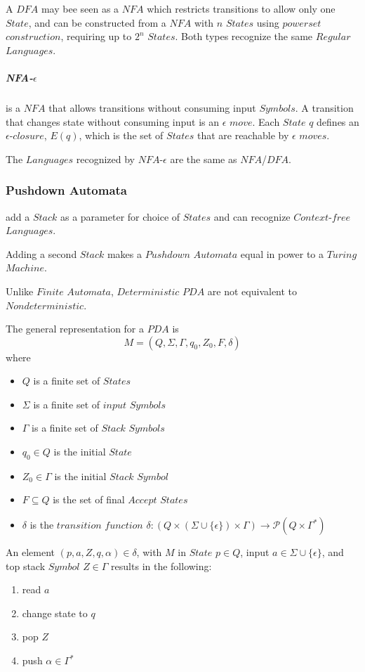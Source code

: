 \documentclass{article}
\begin{document}
    A $DFA$ may bee seen as a $NFA$ which restricts transitions to
    allow only one $State$, and can be constructed from a $NFA$ with
    $n$ $States$ using $powerset$ $construction$, requiring up to
    $2^n$ $States$. Both types recognize the same $Regular$
    $Languages$.

    \subparagraph{NFA-$\epsilon$} is a $NFA$ that allows transitions
    without consuming input $Symbols$. A transition that changes state
    without consuming input is an $\epsilon$ $move$. Each $State$ $q$
    defines an $\epsilon$-$closure$, $E(q)$, which is the set of
    $States$ that are reachable by $\epsilon$ $moves$.

    The $Languages$ recognized by $NFA$-$\epsilon$ are the same as
    $NFA$/$DFA$.

    \subsubsection{Pushdown Automata} add a $Stack$ as a parameter for
    choice of $States$ and can recognize $Context$-$free$ $Languages$.

    Adding a second $Stack$ makes a $Pushdown$ $Automata$ equal in
    power to a $Turing$ $Machine$.

    Unlike $Finite$ $Automata$, $Deterministic$ $PDA$ are not
    equivalent to $Nondeterministic$.

    The general representation for a $PDA$ is
    \[
        M = (Q, \Sigma, \Gamma, q_0, Z_0, F, \delta)
    \]
    where
    \begin{itemize}
    \item $Q$ is a finite set of $States$
    \item $\Sigma$ is a finite set of $input$ $Symbols$
    \item $\Gamma$ is a finite set of $Stack$ $Symbols$
    \item $q_0 \in Q$ is the initial $State$
    \item $Z_0 \in \Gamma$ is the initial $Stack$ $Symbol$
    \item $F \subseteq Q$ is the set of final $Accept$ $States$
    \item $\delta$ is the $transition$ $function$ $\delta:
    (Q \times (\Sigma \cup \{\epsilon\}) \times \Gamma) \rightarrow
    \mathcal{P}(Q \times \Gamma^*)$
    \end{itemize}

    An element $(p,a,Z,q,\alpha)\in\delta$, with $M$ in $State$ $p \in
    Q$, input $a \in \Sigma \cup \{\epsilon\}$, and top stack $Symbol$
    $Z \in \Gamma$ results in the following:
    \begin{enumerate}
    \item read $a$
    \item change state to $q$
    \item pop $Z$
    \item push $\alpha \in \Gamma^*$
    \end{enumerate}
\end{document}
